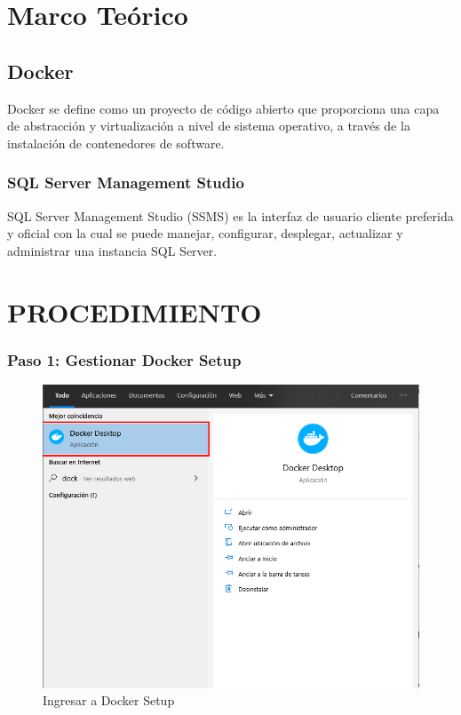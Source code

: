 \documentclass[preprint,12pt]{elsarticle}
\begin{document}
\section{Marco Teórico}


\subsection {\textbf{Docker}}
Docker se define como un proyecto de código abierto que proporciona una capa de abstracción y virtualización a nivel de sistema operativo, a través de la instalación de contenedores de software.
\subsubsection{\textbf{SQL Server Management Studio}}
SQL Server Management Studio (SSMS) es la interfaz de usuario cliente preferida y oficial con la cual se puede manejar, configurar, desplegar, actualizar y administrar una instancia SQL Server.


\section{PROCEDIMIENTO}

\subsubsection{\textbf{Paso 1: Gestionar Docker Setup}}
\begin{figure}[H]
	\begin{center}
		\includegraphics[width=12cm]{./IMAGENES/foto1} 
		\caption{Ingresar a Docker Setup}
	\end{center}
\end{figure}
\end{document}
